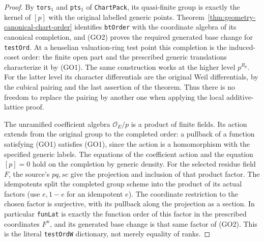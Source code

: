 \begin{proof}
By \texttt{tors\(_1\)} and \texttt{pts\(_1\)} of
\texttt{ChartPack}, its quasi-finite group is exactly the
kernel of \([p]\) with the original labelled generic points.
Theorem~\ref{thm:geometry-canonical-chart-order} identifies
\texttt{btOrder} with the coordinate algebra of its
canonical completion, and (GO2) proves the required generated
base change for \texttt{testOrd}. At a henselian valuation-ring
test point this completion is the induced-coset order:
the finite open part and the prescribed generic translations
characterize it by (GO1). The same construction works at the
higher level \(p^{R_p}\). For the latter level its
character differentials are the original Weil differentials,
by the cubical pairing and the last assertion of the theorem.
Thus there is no freedom to replace the pairing by another
one when applying the local additive-lattice proof.

The unramified coefficient algebra \(\mathcal O_E/p\)
is a product of finite fields. Its action extends from the
original group to the completed order: a pullback of a
function satisfying (GO1) satisfies (GO1), since the action
is a homomorphism with the specified generic labels.
The equations of the coefficient action and the equation
\([p]=0\) hold on the completion by generic density.
For the selected residue field \(F\), the source's
\(pq,sc\) give the projection and inclusion of that product
factor. The idempotents split the completed group scheme
into the product of its actual factors (use \(e,1-e\) for
an idempotent \(e\)). The coordinate restriction to the
chosen factor is surjective, with its pullback along the
projection as a section. In particular \texttt{funLat}
is exactly the function order of this factor in the
prescribed coordinates \(F^n\), and its generated base
change is that same factor of (GO2). This is the literal
\texttt{testOrdW} dictionary, not merely equality of ranks.


\end{proof}
